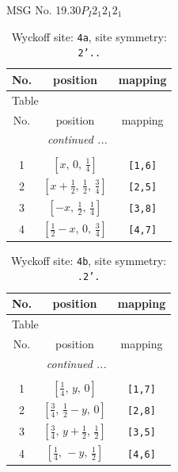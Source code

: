 \documentclass[fleqn,8pt]{jsarticle}
\begin{document}
\setcounter{MaxMatrixCols}{32}

\renewcommand{\tablename}{Table~}
\renewcommand{\figurename}{Figure~}
\begin{center}
\LARGE
MSG No. 19.30\quad$P_{I}2_{1}2_{1}2_{1}$
\end{center}
\renewcommand{\arraystretch}{1.2}
\begin{longtable}{ccc}
\caption{Wyckoff site: {\tt 4a}, site symmetry: {\tt 2'..}}
 \\
 \hline \hline
No. & position & mapping \\ \hline \endfirsthead

\multicolumn{2}{l}{\tablename\ \thetable{}} \\
 \hline \hline
No. & position & mapping \\ \hline \endhead

 \hline \hline
\multicolumn{2}{r}{\footnotesize\it continued ...} \\ \endfoot

 \hline \hline
\multicolumn{2}{r}{} \\ \endlastfoot

1 & $\left[ x,\, 0,\, \frac{1}{4} \right]$ & {\tt [1,6]} \\ \hline
2 & $\left[ x + \frac{1}{2},\, \frac{1}{2},\, \frac{3}{4} \right]$ & {\tt [2,5]} \\ \hline
3 & $\left[ - x,\, \frac{1}{2},\, \frac{1}{4} \right]$ & {\tt [3,8]} \\ \hline
4 & $\left[ \frac{1}{2} - x,\, 0,\, \frac{3}{4} \right]$ & {\tt [4,7]} \\
\end{longtable}
\renewcommand{\arraystretch}{1.2}
\begin{longtable}{ccc}
\caption{Wyckoff site: {\tt 4b}, site symmetry: {\tt .2'.}}
 \\
 \hline \hline
No. & position & mapping \\ \hline \endfirsthead

\multicolumn{2}{l}{\tablename\ \thetable{}} \\
 \hline \hline
No. & position & mapping \\ \hline \endhead

 \hline \hline
\multicolumn{2}{r}{\footnotesize\it continued ...} \\ \endfoot

 \hline \hline
\multicolumn{2}{r}{} \\ \endlastfoot

1 & $\left[ \frac{1}{4},\, y,\, 0 \right]$ & {\tt [1,7]} \\ \hline
2 & $\left[ \frac{3}{4},\, \frac{1}{2} - y,\, 0 \right]$ & {\tt [2,8]} \\ \hline
3 & $\left[ \frac{3}{4},\, y + \frac{1}{2},\, \frac{1}{2} \right]$ & {\tt [3,5]} \\ \hline
4 & $\left[ \frac{1}{4},\, - y,\, \frac{1}{2} \right]$ & {\tt [4,6]} \\
\end{longtable}
\end{document}
